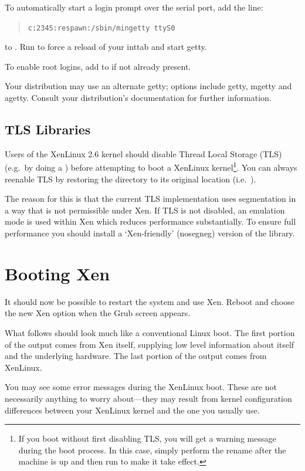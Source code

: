 \documentclass[11pt,twoside,final,openright]{report}
\begin{document}
\newpage
To automatically start a login prompt over the serial port, 
add the line: \begin{quote} {\small {\tt c:2345:respawn:/sbin/mingetty
ttyS0}} \end{quote} to .   Run  to force
a reload of your inttab and start getty.

To enable root logins, add  to  if not
already present.

Your distribution may use an alternate getty; options include getty,
mgetty and agetty.  Consult your distribution's documentation
for further information.


\subsection{TLS Libraries}

Users of the XenLinux 2.6 kernel should disable Thread Local Storage
(TLS) (e.g.\ by doing a ) before
attempting to boot a XenLinux kernel\footnote{If you boot without first
  disabling TLS, you will get a warning message during the boot process.
  In this case, simply perform the rename after the machine is up and
  then run  to make it take effect.}. You can
always reenable TLS by restoring the directory to its original location
(i.e.\ ).

The reason for this is that the current TLS implementation uses
segmentation in a way that is not permissible under Xen. If TLS is not
disabled, an emulation mode is used within Xen which reduces performance
substantially. To ensure full performance you should install a 
`Xen-friendly' (nosegneg) version of the library. 


\section{Booting Xen}

It should now be possible to restart the system and use Xen. Reboot and
choose the new Xen option when the Grub screen appears.

What follows should look much like a conventional Linux boot. The first
portion of the output comes from Xen itself, supplying low level
information about itself and the underlying hardware. The last portion
of the output comes from XenLinux.

You may see some error messages during the XenLinux boot. These are not
necessarily anything to worry about---they may result from kernel
configuration differences between your XenLinux kernel and the one you
usually use.
\end{document}
